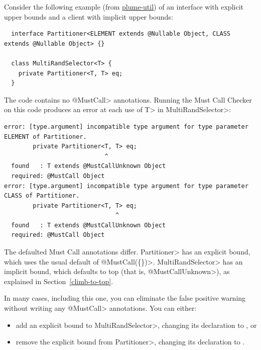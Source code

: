 Consider the following example (from
\href{https://github.com/plume-lib/plume-util}{plume-util}) of an
interface with explicit upper bounds and a client with implicit upper
bounds:
\begin{Verbatim}
  interface Partitioner<ELEMENT extends @Nullable Object, CLASS extends @Nullable Object> {}

  class MultiRandSelector<T> {
    private Partitioner<T, T> eq;
  }
\end{Verbatim}

The code contains no \<@MustCall> annotations.
Running the Must Call Checker on this code produces an error at each use
of \<T> in \<MultiRandSelector>:

\begin{smaller}
\begin{Verbatim}
error: [type.argument] incompatible type argument for type parameter ELEMENT of Partitioner.
        private Partitioner<T, T> eq;
                            ^
  found   : T extends @MustCallUnknown Object
  required: @MustCall Object
error: [type.argument] incompatible type argument for type parameter CLASS of Partitioner.
        private Partitioner<T, T> eq;
                               ^
  found   : T extends @MustCallUnknown Object
  required: @MustCall Object
\end{Verbatim}
\end{smaller}

The defaulted Must Call annotations differ.
\<Partitioner> has an explicit bound, which uses the usual default of \<@MustCall(\{\})>.
\<MultiRandSelector> has an implicit bound, which defaults to top (that is,
\<@MustCallUnknown>), as explained in Section~\ref{climb-to-top}.

In many cases, including this one, you can eliminate the false positive
warning without writing any \<@MustCall> annotations.
You can either:
\begin{itemize}
\item
  add an explicit bound to \<MultiRandSelector>, changing its declaration to
  , or
\item remove the explicit bound from \<Partitioner>, changing its declaration to
  .
\end{itemize}

